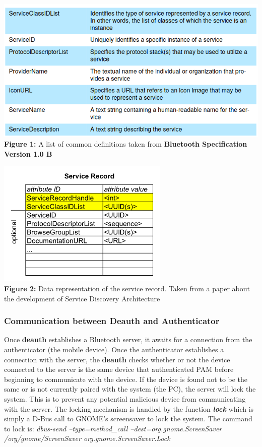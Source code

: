 \documentclass[letterpaper,twocolumn,10pt]{article}
\begin{document}
{{\hrulefill

\includegraphics[scale=0.3]{bluetooth-definitions.png}
\small \textbf{Figure 1:} A list of common definitions taken from \textbf{Bluetooth Specification Version 1.0 B}~\cite{bluetooth_basics}

\includegraphics[scale=0.5]{bluetooth-service.png}\\
\small \textbf{Figure 2:} Data representation of the service record. Taken from a paper about the development of Service Discovery Architecture~\cite{bluetooth_sdp_development}

\normalsize
\subsubsection{Communication between Deauth and Authenticator}

Once \textbf{deauth} establishes a Bluetooth server, it awaits for a connection from the authenticator (the mobile device). Once the authenticator establishes a connection with the server, the \textbf{deauth} checks whether or not the device connected to the server is the same device that authenticated PAM before beginning to communicate with the device. If the device is found not to be the same or is not currently paired with the system (the PC), the server will lock the system. This is to prevent any potential malicious device from communicating with the server. The locking mechanism is handled by the function \textbf{\emph{lock}} which is simply a D-Bus call to GNOME's screensaver to lock the system. The command to lock is: \emph{dbus-send --type=method\_call --dest=org.gnome.ScreenSaver /org/gnome/ScreenSaver org.gnome.ScreenSaver.Lock}

}}
\end{document}
